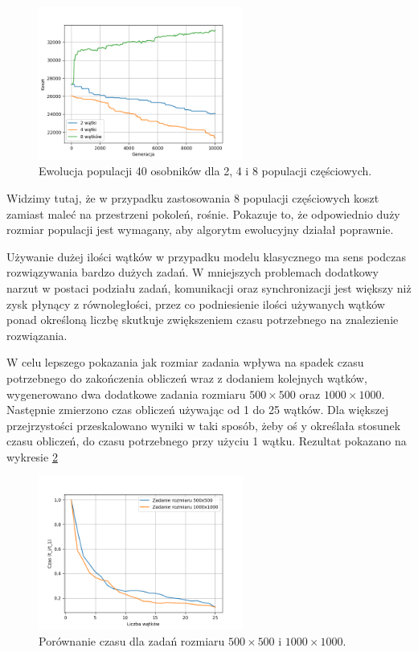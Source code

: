 \begin{figure}[H]
    \centering        
    \includegraphics[width=0.6\textwidth]{img/zla_zbieznosc_watki.png}
    \caption{Ewolucja populacji 40 osobników dla 2, 4 i 8 populacji częściowych.}
    \label{zla_zbieznosc_watki}
\end{figure}

Widzimy tutaj, że w przypadku zastosowania 8 populacji częściowych koszt zamiast maleć na przestrzeni pokoleń, rośnie. Pokazuje to, że odpowiednio 
duży rozmiar populacji jest wymagany, aby algorytm ewolucyjny działał poprawnie.

Używanie dużej ilości wątków w przypadku modelu klasycznego ma sens podczas rozwiązywania bardzo dużych zadań. W mniejszych problemach dodatkowy narzut w 
postaci podziału zadań, komunikacji oraz synchronizacji jest większy niż zysk płynący z równoległości, przez co podniesienie ilości używanych wątków ponad 
określoną liczbę skutkuje zwiększeniem czasu potrzebnego na znalezienie rozwiązania. 

W celu lepszego pokazania jak rozmiar zadania wpływa na spadek czasu potrzebnego do zakończenia obliczeń wraz z dodaniem kolejnych wątków, wygenerowano 
dwa dodatkowe zadania rozmiaru $500 \times 500$ oraz $1000 \times 1000$. Następnie zmierzono czas obliczeń używając od 1 do 25 wątków. Dla większej 
przejrzystości przeskalowano wyniki w taki sposób, żeby oś y określała stosunek czasu obliczeń, do czasu potrzebnego przy użyciu 1 wątku. Rezultat 
pokazano na wykresie \ref{threads_comparsion_500x500_1000x1000}

\begin{figure}[H]
    \centering        
    \includegraphics[width=0.6\textwidth]{img/compare_500_1000.png}
    \caption{Porównanie czasu dla zadań rozmiaru $500 \times 500$ i $1000 \times 1000$.}
    \label{threads_comparsion_500x500_1000x1000}
\end{figure}

